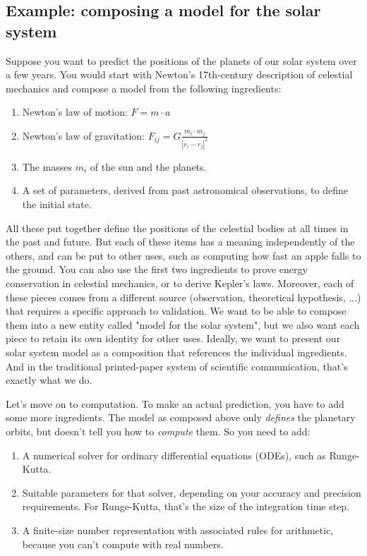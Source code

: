 \subsection{Example: composing a model for the solar system}

Suppose you want to predict the positions of the planets of our solar system over a few years. You would start with Newton's 17th-century description of celestial mechanics and compose a model from the following ingredients:

\begin{enumerate}
\item Newton's law of motion:
      $F = m \cdot a$
\item Newton's law of gravitation:
      $F_{ij} = G \frac{m_i \cdot m_j}{|r_i-r_j|^2}$
\item The masses $m_i$ of the sun and the planets.
\item A set of parameters, derived from past astronomical observations, to define the initial state.
\setcounter{myCounter}{\theenumi}
\end{enumerate}

All these put together define the positions of the celestial bodies at all times in the past and future. But each of these items has a meaning independently of the others, and can be put to other uses, such as computing how fast an apple falls to the ground. You can also use the first two ingredients to prove energy conservation in celestial mechanics, or to derive Kepler's laws. Moreover, each of these pieces comes from a different source (observation, theoretical hypothesis, ...) that requires a specific approach to validation. We want to be able to compose them into a new entity called "model for the solar system", but we also want each piece to retain its own identity for other uses. Ideally, we want to present our solar system model as a composition that references the individual ingredients. And in the traditional printed-paper system of scientific communication, that's exactly what we do.

Let's move on to computation. To make an actual prediction, you have to add some more ingredients. The model as composed above only \textit{defines} the planetary orbits, but doesn't tell you how to \textit{compute} them. So you need to add:

\begin{enumerate}
\setcounter{enumi}{\themyCounter}
\item A numerical solver for ordinary differential equations (ODEs), such as Runge-Kutta.
\item Suitable parameters for that solver, depending on your accuracy and precision requirements. For Runge-Kutta, that's the size of the integration time step.
\item A finite-size number representation with associated rules for arithmetic, because you can't compute with real numbers.
\setcounter{myCounter}{\theenumi}
\end{enumerate}

